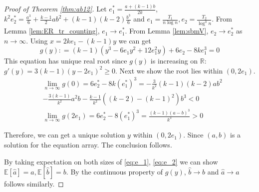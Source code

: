 \documentclass[entropy,article,submit,moreauthors,pdftex]{Definitions/mdpi}
\newcommand{\1}{\mathbbm{1}}
\begin{document}
\begin{proof}[Proof of Theorem \ref{thm:ab12}]
	Let $e^*_1 = \frac{a+(k-1)b}{2k}$, $k^2 e^*_2 = \frac{a^3}{6} + \frac{k-1}{2}ab^2 + (k-1)(k-2)\frac{b^3}{6}$
	and $e_1 = \frac{T_1}{n\log n}, e_2 = \frac{T_2}{\log^3 n}$.
	From Lemma \ref{lem:ER_tr_counting}, $e_1 \to e^*_1$.
	From Lemma \ref{lem:sbmV}, $e_2 \to e^*_2$ as $n\to \infty$.
	Using $x=2ke_1 - (k-1)y$ we can get
\begin{equation}
g(y): = (k-1)(y^3 - 6 e_1 y^2 + 12 e_1^2 y) + 6 e_2 - 8 k e_1^3 = 0
\end{equation}
This equation has unique real root since $g(y)$ is increasing on $\mathbb{R}$:  $g'(y) = 3(k-1)(y-2e_1)^2 \geq 0 $.
Next we show the root lies within $(0, 2e_1)$.
\begin{align*}
&\lim_{n\to \infty}g(0) =  6e^*_2 - 8k(e^*_1)^3 =-\frac{3}{k^2}(k-1)(k-2)ab^2 \\
&-\frac{3(k-1)}{k^2}a^2b - \frac{k-1}{k^2} ((k-2)-(k-1)^2)b^3 < 0 \\
&\lim_{n\to \infty}g(2e_1) = 6e^*_2 - 8(e^*_1)^3 = \frac{(k-1)(a-b)^3}{k^3} > 0
\end{align*}

Therefore, we can get a unique solution $y$ within $(0, 2e_1)$. Since $(a,b)$ is a solution for the equation array. The conclusion follows.

By taking expectation on both sizes of \eqref{eq:e_1}, \eqref{eq:e_2} we can show $\mathbb{E}[\hat{a}] = a,
\mathbb{E}[\hat{b}] = b$. By the continuous property of $g(y)$, $\hat{b} \to b$ and $\hat{a} \to a$ follows similarly.
\end{proof}
\end{document}
